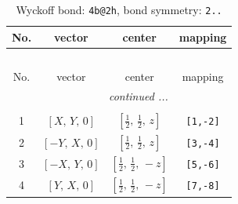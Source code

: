 \documentclass[fleqn,8pt]{jsarticle}
\begin{document}
\renewcommand{\arraystretch}{1.2}
\begin{longtable}{cccc}
\caption{Wyckoff bond: {\tt 4b@2h}, bond symmetry: {\tt 2..}}
 \\
 \hline \hline
No. & vector & center & mapping \\ \hline \endfirsthead

\multicolumn{3}{l}{\tablename\ \thetable{}} \\
 \hline \hline
No. & vector & center & mapping \\ \hline \endhead

 \hline \hline
\multicolumn{3}{r}{\footnotesize\it continued ...} \\ \endfoot

 \hline \hline
\multicolumn{3}{r}{} \\ \endlastfoot

1 & $\left[ X,\, Y,\, 0 \right]$ & $\left[ \frac{1}{2},\, \frac{1}{2},\, z \right]$ & {\tt [1,-2]} \\ \hline
2 & $\left[ - Y,\, X,\, 0 \right]$ & $\left[ \frac{1}{2},\, \frac{1}{2},\, z \right]$ & {\tt [3,-4]} \\ \hline
3 & $\left[ - X,\, Y,\, 0 \right]$ & $\left[ \frac{1}{2},\, \frac{1}{2},\, - z \right]$ & {\tt [5,-6]} \\ \hline
4 & $\left[ Y,\, X,\, 0 \right]$ & $\left[ \frac{1}{2},\, \frac{1}{2},\, - z \right]$ & {\tt [7,-8]} \\
\end{longtable}
\renewcommand{\arraystretch}{1.2}
\end{document}
